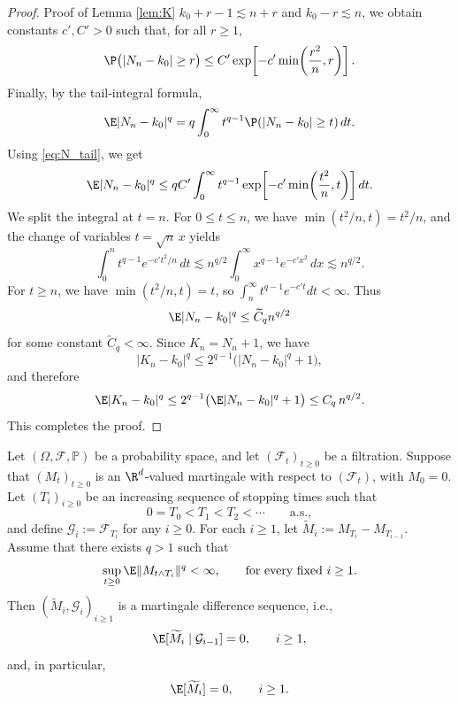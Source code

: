 \documentclass[mnsc,nonblindrev]{informs3}
\begin{document}
\begin{proof}{Proof of Lemma \ref{lem:K}}
\(k_0+r-1\lesssim n+r\) and \(k_0-r\lesssim n\), we obtain constants
\(c',C'>0\) such that, for all \(r\ge1\),
\begin{equation}\label{eq:N_tail}
\P\bigl(|N_n-k_0|\ge r\bigr)
\le
C'\exp\!\left[-c'\min\!\left(\frac{r^2}{n},r\right)\right].
\end{equation}
Finally, by the tail-integral formula,
\[
\E|N_n-k_0|^q
=
q\int_0^\infty t^{q-1}\P(|N_n-k_0|\ge t)\,dt.
\]
Using \eqref{eq:N_tail}, we get
\[
\E|N_n-k_0|^q
\le
qC'\int_0^\infty t^{q-1}
\exp\!\left[-c'\min\!\left(\frac{t^2}{n},t\right)\right]dt.
\]
We split the integral at \(t=n\). For \(0\le t\le n\), we have
\(\min(t^2/n,t)=t^2/n\), and the change of variables \(t=\sqrt n\,x\) yields
\[
\int_0^n t^{q-1}e^{-c't^2/n}\,dt
\lesssim
n^{q/2}\int_0^\infty x^{q-1}e^{-c'x^2}\,dx
\lesssim
n^{q/2}.
\]
For \(t\ge n\), we have \(\min(t^2/n,t)=t\), so $\int_n^\infty t^{q-1}e^{-c't}dt<\infty.$ Thus 
\[
\E|N_n-k_0|^q\le \widetilde C_q n^{q/2}
\]
for some constant \(\widetilde C_q<\infty\). Since \(K_n=N_n+1\), we have
\[
|K_n-k_0|^q\le 2^{q-1}\bigl(|N_n-k_0|^q+1\bigr),
\]
and therefore
\[
\E|K_n-k_0|^q
\le
2^{q-1}\bigl(\E|N_n-k_0|^q+1\bigr)
\le
C_q\, n^{q/2}.
\]
This completes the proof.
\end{proof}
\begin{lemma}\label{lem:mds-tildeMi-proof}
Let \((\Omega,\mathcal F,\mathbb P)\) be a probability space, and let
\((\mathcal F_t)_{t\ge 0}\) be a filtration. Suppose that
\((M_t)_{t\ge 0}\) is an \(\R^d\)-valued martingale with respect to
\((\mathcal F_t)\), with \(M_0=0\). Let \((T_i)_{i\ge 0}\) be an increasing
sequence of stopping times such that
\[
0=T_0<T_1<T_2<\cdots
\qquad \text{a.s.},
\]
and define $\mathcal G_i:=\mathcal F_{T_i}$ for any $i\ge 0.$ For each \(i\ge 1\), let $\widetilde M_i:=M_{T_i}-M_{T_{i-1}}.$ Assume that there exists \(q>1\) such that
\begin{equation}\label{eq:UI-assumption}
\sup_{t\ge 0}\E\|M_{t\wedge T_i}\|^q<\infty,
\qquad \text{for every fixed } i\ge 1.
\end{equation}
Then \((\widetilde M_i,\mathcal G_i)_{i\ge 1}\) is a martingale difference
sequence, i.e.,
\[
\E[\widetilde M_i\mid \mathcal G_{i-1}]=0,
\qquad i\ge 1,
\]
and, in particular,
\[
\E[\widetilde M_i]=0,
\qquad i\ge 1.
\]
\end{lemma}
\end{document}
